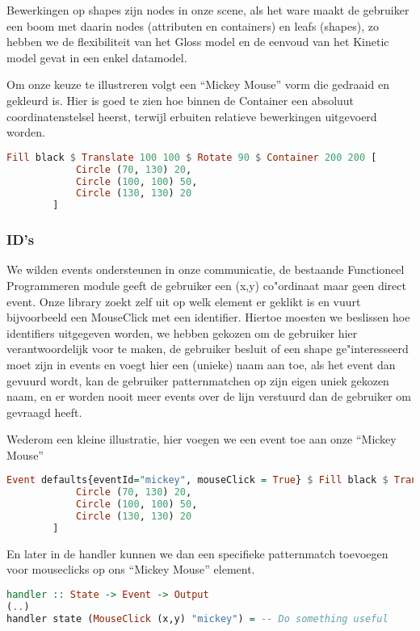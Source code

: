 Bewerkingen op shapes zijn nodes in onze scene, als het ware maakt de gebruiker een boom met daarin nodes (attributen en containers) en leafs (shapes), zo hebben we de flexibiliteit van het Gloss model en de eenvoud van het Kinetic model gevat in een enkel datamodel.

Om onze keuze te illustreren volgt een ``Mickey Mouse'' vorm die gedraaid en gekleurd is. Hier is goed te zien hoe binnen de Container een absoluut coordinatenstelsel heerst, terwijl erbuiten relatieve bewerkingen uitgevoerd worden.

\begin{lstlisting}[style=densecode, language=Haskell]
Fill black $ Translate 100 100 $ Rotate 90 $ Container 200 200 [
            Circle (70, 130) 20,
            Circle (100, 100) 50,
            Circle (130, 130) 20
        ]
\end{lstlisting}

\subsubsection{ID's}

We wilden events ondersteunen in onze communicatie, de bestaande Functioneel Programmeren module geeft de gebruiker een (x,y) co"ordinaat maar geen direct event. Onze library zoekt zelf uit op welk element er geklikt is en vuurt bijvoorbeeld een MouseClick met een identifier. Hiertoe moesten we beslissen hoe identifiers uitgegeven worden, we hebben gekozen om de gebruiker hier verantwoordelijk voor te maken, de gebruiker besluit of een shape ge"interesseerd moet zijn in events en voegt hier een (unieke) naam aan toe, als het event dan gevuurd wordt, kan de gebruiker patternmatchen op zijn eigen uniek gekozen naam, en er worden nooit meer events over de lijn verstuurd dan de gebruiker om gevraagd heeft.

Wederom een kleine illustratie, hier voegen we een event toe aan onze ``Mickey Mouse''
\begin{lstlisting}[style=densecode, language=Haskell]
Event defaults{eventId="mickey", mouseClick = True} $ Fill black $ Translate 100 100 $ Rotate 90 $ Container 200 200 [
            Circle (70, 130) 20,
            Circle (100, 100) 50,
            Circle (130, 130) 20
        ]
\end{lstlisting}

En later in de handler kunnen we dan een specifieke patternmatch toevoegen voor mouseclicks op ons ``Mickey Mouse'' element.
\begin{lstlisting}[style=densecode, language=Haskell]
handler :: State -> Event -> Output
(..)
handler state (MouseClick (x,y) "mickey") = -- Do something useful
\end{lstlisting}

